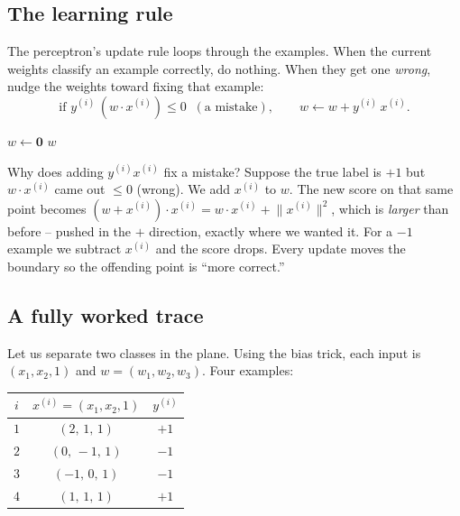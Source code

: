 \subsection{The learning rule}

The perceptron's update rule loops through the examples.
When the current weights classify an example correctly, do nothing. When they get
one \emph{wrong}, nudge the weights toward fixing that example:
\[
  \text{if } y^{(i)}\,(w\cdot x^{(i)}) \le 0 \;\;(\text{a mistake}),\qquad
  w \leftarrow w + y^{(i)}\, x^{(i)} .
\]

\begin{algorithm}[H]
\caption{\textsc{Perceptron} (with the bias folded into $w$)}
$w \leftarrow \mathbf{0}$\;
\Return $w$\;
\end{algorithm}

\begin{intuitionbox}
Why does adding $y^{(i)} x^{(i)}$ fix a mistake? Suppose the true label is $+1$
but $w\cdot x^{(i)}$ came out $\le 0$ (wrong). We add $x^{(i)}$ to $w$. The new
score on that same point becomes
$(w + x^{(i)})\cdot x^{(i)} = w\cdot x^{(i)} + \lVert x^{(i)}\rVert^2$, which is
\emph{larger} than before -- pushed in the $+$ direction, exactly where we wanted
it. For a $-1$ example we subtract $x^{(i)}$ and the score drops. Every update
moves the boundary so the offending point is ``more correct.''
\end{intuitionbox}

\subsection{A fully worked trace}

Let us separate two classes in the plane. Using the bias trick, each input is
$(x_1,x_2,1)$ and $w=(w_1,w_2,w_3)$. Four examples:

\begin{center}
\begin{tabular}{ccc}
\toprule
$i$ & $x^{(i)}=(x_1,x_2,1)$ & $y^{(i)}$ \\
\midrule
$1$ & $(2,\,1,\,1)$ & $+1$ \\
$2$ & $(0,\,-1,\,1)$ & $-1$ \\
$3$ & $(-1,\,0,\,1)$ & $-1$ \\
$4$ & $(1,\,1,\,1)$ & $+1$ \\
\bottomrule
\end{tabular}
\end{center}

